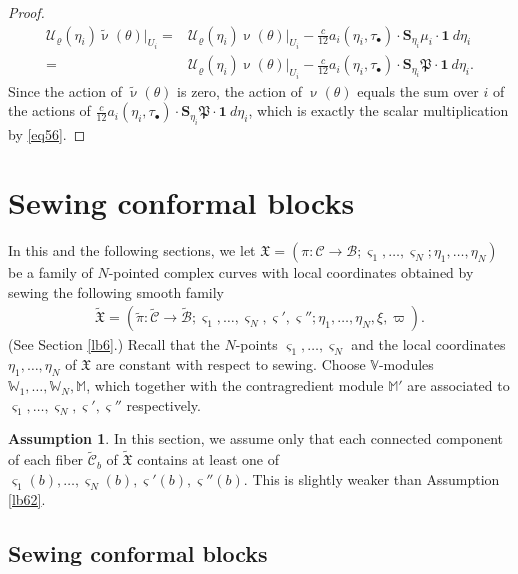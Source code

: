 \documentclass[11pt,b5paper,notitlepage]{article}
\theoremstyle{definition}
\newtheorem{ass}[df]{Assumption}
\theoremstyle{plain}
\newcommand{\fk}{\mathfrak}
\newcommand{\mc}{\mathcal}
\newcommand{\wtd}{\widetilde}
\newcommand{\id}{\mathbf{1}}
\newcommand{\sgm}{\varsigma}
\newcommand{\blt}{\bullet}
\newcommand{\Vbb}{\mathbb V}
\newcommand{\Wbb}{\mathbb W}
\newcommand{\Mbb}{\mathbb M}
\newcommand{\Sbf}{\mathbf{S}}
\numberwithin{equation}{section}
\begin{document}
\begin{proof}
	\begin{align*}
	\mc U_\varrho(\eta_i)\wtd\upnu(\theta)|_{U_i}=&\mc U_\varrho(\eta_i)\upnu(\theta)|_{U_i}-\frac{c}{12} a_i(\eta_i,\tau_\blt)\cdot\Sbf_{\eta_i}\mu_i\cdot \id~d{\eta_i}\\
	=&\mc U_\varrho(\eta_i)\upnu(\theta)|_{U_i}-\frac{c}{12} a_i(\eta_i,\tau_\blt)\cdot\Sbf_{\eta_i}\fk P\cdot \id~d{\eta_i}.
	\end{align*}
	Since the action of $\wtd\upnu(\theta)$ is zero, the action of $\upnu(\theta)$ equals the sum over $i$ of the actions of $\frac{c}{12} a_i(\eta_i,\tau_\blt)\cdot\Sbf_{\eta_i}\fk P\cdot \id~d{\eta_i}$, which is exactly the scalar multiplication by \eqref{eq56}.
\end{proof}





\section{Sewing conformal blocks}\label{lb35}


In this and the following sections, we let $\fk X=(\pi:\mc C\rightarrow\mc B;\sgm_1,\dots,\sgm_N;\eta_1,\dots,\eta_N)$ be a family of $N$-pointed complex curves with local coordinates obtained by sewing the following smooth family
\begin{align*}
\wtd{\fk X}=(\wtd\pi:\wtd{\mc C}\rightarrow\wtd{\mc B};\sgm_1,\dots,\sgm_N,\sgm',\sgm'';\eta_1,\dots,\eta_N,\xi,\varpi).
\end{align*}
(See Section \ref{lb6}.) Recall that the $N$-points  $\sgm_1,\dots,\sgm_N$ and the local coordinates $\eta_1,\dots,\eta_N$ of $\fk X$ are constant with respect to sewing. Choose $\Vbb$-modules $\Wbb_1,\dots,\Wbb_N,\Mbb$, which together with the contragredient module $\Mbb'$ are associated to $\sgm_1,\dots,\sgm_N,\sgm',\sgm''$ respectively. 

\begin{ass}\label{lb63}
In this section, we assume only that each connected component of each fiber $\wtd{\mc C}_b$ of $\wtd{\fk X}$ contains at least one of $\sgm_1(b),\dots,\sgm_N(b),\sgm'(b),\sgm''(b)$. This is slightly weaker than Assumption \ref{lb62}.
\end{ass}



\subsection*{Sewing conformal blocks}
\end{document}
